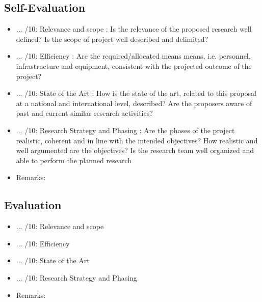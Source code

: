\subsection{Self-Evaluation}
\begin{itemize}
    \item ... /10: Relevance and scope : Is the relevance of the proposed research well defined? Is the scope of project well described and delimited?
    \item ... /10: Efficiency : Are the required/allocated means means, i.e. personnel, infrastructure and equipment, consistent with the projected outcome of the project?
    \item ... /10: State of the Art : How is the state of the art, related to this proposal at a national and international level, described? Are the proposers aware of past and current similar research activities?
    \item ... /10: Research Strategy and Phasing : Are the phases of the project realistic, coherent and in line with the intended objectives? How realistic and well argumented are the objectives? Is the research team well organized and able to perform the planned research
    \item Remarks: 
\end{itemize}

\subsection{Evaluation}
\begin{itemize}
    \item ... /10: Relevance and scope
    \item ... /10: Efficiency
    \item ... /10: State of the Art
    \item ... /10: Research Strategy and Phasing
    \item Remarks: 
\end{itemize}